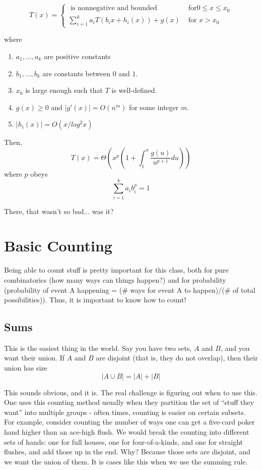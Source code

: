 \documentclass[11pt]{article}
\begin{document}
	$$T(x) = \left\{ \begin{array}{cc} \textrm{ is nonnegative and bounded} & \textrm{ for} 0 \leq x \leq x_0 \\
	\sum_{i=1}^k a_iT(b_ix + h_i(x)) + g(x) & \textrm{ for } x > x_0 \end{array} \right. $$

	where
	
	\begin{enumerate}
		\item $a_1, \ldots, a_k$ are positive constants
		\item $b_1, \ldots, b_k$ are constants between $0$ and $1$.
		\item $x_0$ is large enough such that $T$ is well-defined.
		\item $g(x) \geq 0$ and $|g'(x)| = O(n^m)$ for some integer $m$.
		\item $|h_i(x)| = O(x/log^2x)$	
	\end{enumerate}
	Then, 
	$$T(x) = \Theta \left( x^p \left( 1 + \int_1^x \frac{g(u)}{u^{p+1}}du\right)\right)$$
	where $p$ obeys
	$$\sum_{i=1}^k a_i b_i^p = 1$$

	There, that wasn't so bad... was it?

\section{Basic Counting}

Being able to count stuff is pretty important for this class, both for pure combinatorics
(how many ways can things happen?) and for probability
(probability of event A happening = (\# ways for event A to happen)/(\# of total possibilities)).  Thus, it is important to know how to count!

\subsection{Sums}
	This is the easiest thing in the world.  Say you have two sets, $A$ and $B$, and you want their union.  If $A$ and $B$ are disjoint (that is, they do not overlap), then
	their union has size
	$$|A \cup B| = |A| + |B|$$
	
	This sounds obvious, and it is.  The real challenge is figuring out when to use this.
	One uses this counting method usually when they partition the set of ``stuff they want''
	into multiple groups - often times, counting is easier on certain subsets.  For example,
	consider counting the number of ways one can get a five-card 
	poker hand higher than an ace-high flush.  We would break the counting into different sets of hands: one for full houses, one for four-of-a-kinds, and one for straight
	flushes, and add those up in the end.  Why?  Because those sets are disjoint,
	and we want the union of them.  It is cases like this when we use the summing rule.
	
\end{document}
